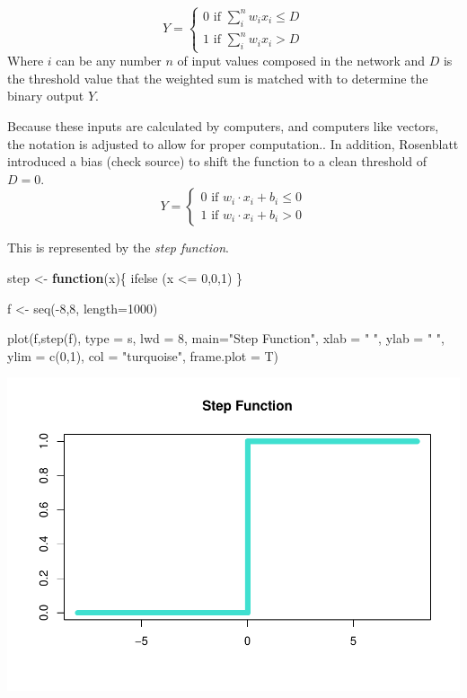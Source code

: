 \documentclass[
]{article}
\newenvironment{Shaded}{\begin{snugshade}}{\end{snugshade}}
\newcommand{\AttributeTok}[1]{\textcolor[rgb]{0.77,0.63,0.00}{#1}}
\newcommand{\ControlFlowTok}[1]{\textcolor[rgb]{0.13,0.29,0.53}{\textbf{#1}}}
\newcommand{\DecValTok}[1]{\textcolor[rgb]{0.00,0.00,0.81}{#1}}
\newcommand{\FunctionTok}[1]{\textcolor[rgb]{0.00,0.00,0.00}{#1}}
\newcommand{\NormalTok}[1]{#1}
\newcommand{\OtherTok}[1]{\textcolor[rgb]{0.56,0.35,0.01}{#1}}
\newcommand{\SpecialCharTok}[1]{\textcolor[rgb]{0.00,0.00,0.00}{#1}}
\newcommand{\StringTok}[1]{\textcolor[rgb]{0.31,0.60,0.02}{#1}}
\begin{document}
\[
Y = 
\begin{cases}
0 \text{ if } \sum_i^n w_ix_i \le D \\
1 \text{ if } \sum_i^n w_ix_i > D
\end{cases}
\] Where \(i\) can be any number \(n\) of input values composed in the
network and \(D\) is the threshold value that the weighted sum is
matched with to determine the binary output \(Y\).

Because these inputs are calculated by computers, and computers like
vectors, the notation is adjusted to allow for proper computation.. In
addition, Rosenblatt introduced a bias (check source) to shift the
function to a clean threshold of \(D = 0\). \[
Y = 
\begin{cases}
0 \text{ if } w_i \cdot x_i + b_i \le 0 \\
1 \text{ if } w_i \cdot x_i + b_i > 0
\end{cases}
\]

This is represented by the \emph{step function}.

\begin{Shaded}
\begin{Highlighting}[]
\NormalTok{step }\OtherTok{\textless{}{-}} \ControlFlowTok{function}\NormalTok{(x)\{}
  \FunctionTok{ifelse}\NormalTok{ (x }\SpecialCharTok{\textless{}=} \DecValTok{0}\NormalTok{,}\DecValTok{0}\NormalTok{,}\DecValTok{1}\NormalTok{) }
\NormalTok{\}}

\NormalTok{f }\OtherTok{\textless{}{-}} \FunctionTok{seq}\NormalTok{(}\SpecialCharTok{{-}}\DecValTok{8}\NormalTok{,}\DecValTok{8}\NormalTok{, }\AttributeTok{length=}\DecValTok{1000}\NormalTok{)}

\FunctionTok{plot}\NormalTok{(f,}\FunctionTok{step}\NormalTok{(f), }\AttributeTok{type =} \StringTok{\textquotesingle{}s\textquotesingle{}}\NormalTok{, }\AttributeTok{lwd =} \DecValTok{8}\NormalTok{, }\AttributeTok{main=}\StringTok{"Step Function"}\NormalTok{, }\AttributeTok{xlab =} \StringTok{" "}\NormalTok{, }\AttributeTok{ylab =} \StringTok{" "}\NormalTok{, }\AttributeTok{ylim =} \FunctionTok{c}\NormalTok{(}\DecValTok{0}\NormalTok{,}\DecValTok{1}\NormalTok{), }\AttributeTok{col =} \StringTok{"turquoise"}\NormalTok{, }\AttributeTok{frame.plot =}\NormalTok{ T)}
\end{Highlighting}
\end{Shaded}

\includegraphics{ANN_files/unnamed-chunk-1-1.pdf}
\end{document}
